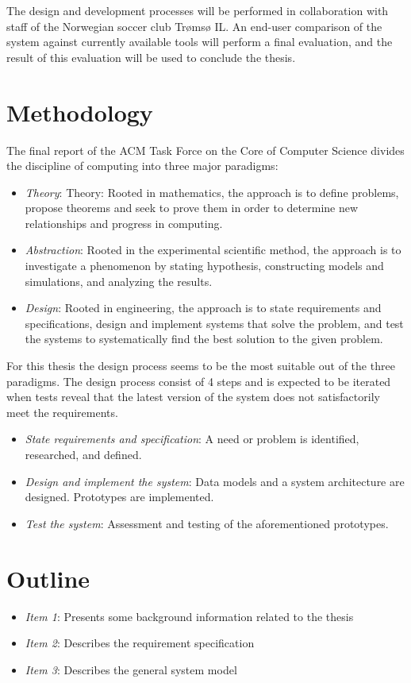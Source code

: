 The design and development processes will be performed in collaboration with staff of the Norwegian soccer club Trømsø IL. An end-user comparison of the system against currently available tools will perform a final evaluation, and the result of this evaluation will be used to conclude the thesis.

\section{Methodology}

The final report of the ACM Task Force on the Core of Computer Science \cite{computing_as_a_discipline} divides the discipline of computing into three major paradigms:

\begin{itemize}
\item \emph{Theory}: 
Theory: Rooted in mathematics, the approach is to define problems, propose theorems and seek to prove them in order to determine new relationships and progress in computing.
  
\item \emph{Abstraction}: 
Rooted in the experimental scientific method, the approach is to investigate a phenomenon by stating hypothesis, constructing models and simulations, and analyzing the results.
  
\item \emph{Design}: 
Rooted in engineering, the approach is to state requirements and specifications, design and implement systems that solve the problem, and test the systems to systematically find the best solution to the given problem.

\end{itemize}

For this thesis the design process seems to be the most suitable out of the three paradigms. The design process consist of 4 steps and is expected to be iterated when tests reveal that the latest version of the system does not satisfactorily meet the requirements.

\begin{itemize}
  \item \emph{State requirements and specification}: A need or problem is identified, researched, and defined.
  \item \emph{Design and implement the system}: Data models and a system architecture are designed. Prototypes are implemented.
  \item \emph{Test the system}: Assessment and testing of the aforementioned prototypes.
\end{itemize}

\section{Outline}

\begin{itemize}
  \item \emph{Item 1}: Presents some background information related to the thesis
  \item \emph{Item 2}: Describes the requirement specification
  \item \emph{Item 3}: Describes the general system model
\end{itemize}